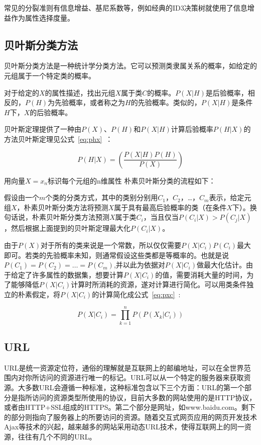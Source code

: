 常见的分裂准则有信息增益、基尼系数等，例如经典的ID3决策树就使用了信息增益作为属性选择度量。

\subsection{贝叶斯分类方法}

贝叶斯分类方法是一种统计学分类方法。它可以预测类隶属关系的概率，如给定的元组属于一个特定类的概率。

对于给定的$X$的属性描述，找出元组$X$属于类$C$的概率。$P(X|H)$是后验概率，相反的，$P(H)$为先验概率，或者称之为$H$的先验概率。类似的，$P(X|H)$是条件$H$下，$X$的后验概率。

贝叶斯定理提供了一种由$P(X)$、$P(H)$和$P(X|H)$计算后验概率$P(H|X)$的方法贝叶斯定理见公式~\ref{eq:phx}~：

\begin{equation} \label{eq:phx}
P(H|X) = \left(\frac{P(X|H)P(H)}{P(X)}\right)
\end{equation}

用向量$X={x_n}$标识每个元组的n维属性
朴素贝叶斯分类的流程如下：

假设由一个$m$个类的分类方式，其中的类别分别用$C_1$，$C_2$，…，$C_m$表示，给定元组$X$，朴素贝叶斯分类方法将预测$X$属于具有最高后验概率的类（在条件$X$下）。换句话说，朴素贝叶斯分类方法预测$X$属于类$C_i$，当且仅当$P(C_i|X)>P(C_j|X)$，然后根据上面提到的贝叶斯定理最大化$P(C_i|X)$。

由于$P(X)$对于所有的类来说是一个常数，所以仅仅需要$P(X|C_i)P(C_i)$最大即可。若类的先验概率未知，则通常假设这些类都是等概率的。也就是说$P(C_1)=P(C_2)= … =P(C_m)$,并以此为依据对$P(X|C_i)$做最大化估计。由于给定了许多属性的数据集，想要计算$P(X|C_i)$的值，需要消耗大量的时间，为了能够降低$P(X|C_i)$计算时所消耗的资源，遂对计算进行简化。可以用类条件独立的朴素假定，将$P(X|C_i)$的计算简化成公式~\ref{eq:pxc}~:

\begin{equation} \label{eq:pxc}
P(X|C_i) = \prod_{k=1}^nP\left(P(X_k|C_i)\right)
\end{equation}

\subsection{URL}
URL是统一资源定位符，通俗的理解就是互联网上的邮编地址，可以在全世界范围内对你所访问的资源进行唯一的标记。URL可以从一个特定的服务器来获取资源。大多数URL会遵循一种标准，这种标准包含以下三个方面：URL的第一个部分是指所访问的资源类型所使用的协议，目前大多数的网站使用的是HTTP协议，或者由HTTP+SSL组成的HTTPS。第二个部分是网址，如www.baidu.com。剩下的部分则指向了服务器上的所要访问的资源。随着交互式网页应用的网页开发技术Ajax等技术的兴起，越来越多的网站采用动态URL技术，使得互联网上的同一资源，往往有几个不同的URL。
